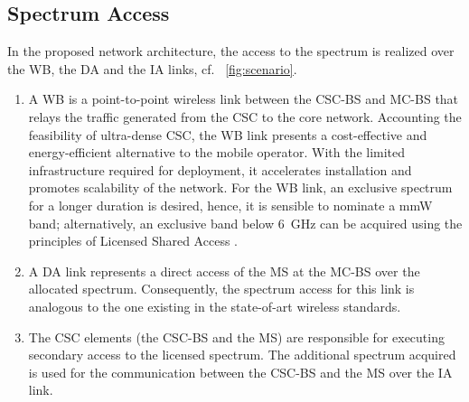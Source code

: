 \documentclass[draftcls, onecolumn, 11pt]{IEEEtran}
\begin{document}
\subsection*{Spectrum Access}
In the proposed network architecture, the access to the spectrum is realized over the WB, the DA and the IA links, cf. \figurename~\ref{fig:scenario}. 
\begin{enumerate}
\item A WB is a 
point-to-point wireless link between the CSC-BS and MC-BS that relays the traffic generated from the CSC to the core network. Accounting the feasibility of ultra-dense CSC, the WB link presents a cost-effective and energy-efficient alternative to the mobile operator. 
With the limited infrastructure required for deployment, it accelerates installation and promotes scalability of the network. 
For the WB link, an exclusive spectrum for a longer duration is desired, hence, it is sensible to nominate a mmW band; alternatively, an exclusive band below \SI{6}{GHz} can be acquired using the principles of Licensed Shared Access \cite{ETSI13}. 

\item A DA link represents a direct access of the MS at the MC-BS over the allocated spectrum. Consequently, the spectrum access for this link is analogous to the one existing in the state-of-art wireless standards. 
\item The CSC elements (the CSC-BS and the MS) are responsible for executing secondary access to the licensed spectrum. The additional spectrum acquired is used for the communication between the CSC-BS and the MS over the IA link.
\end{enumerate} 
\end{document}
